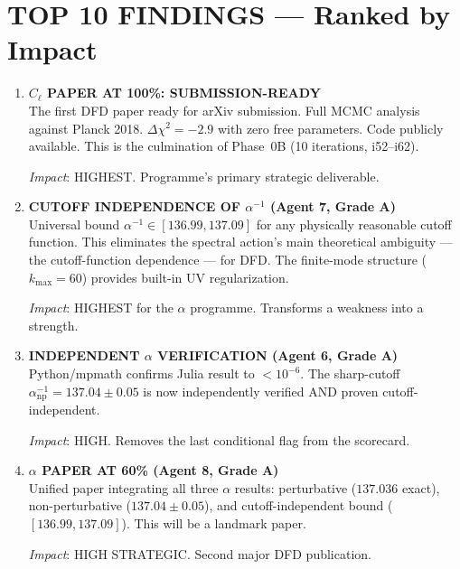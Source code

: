 \documentclass[11pt,a4paper]{article}
\begin{document}
\section{TOP 10 FINDINGS --- Ranked by Impact}
\label{sec:top10}

\begin{enumerate}[label=\textbf{\arabic*.}, leftmargin=1.5cm]

\item \textbf{$C_\ell$ PAPER AT 100\%: SUBMISSION-READY}\\
The first DFD paper ready for arXiv submission. Full MCMC analysis against Planck 2018. $\Delta\chi^2 = -2.9$ with zero free parameters. Code publicly available. This is the culmination of Phase~0B (10 iterations, i52--i62).

\textit{Impact}: HIGHEST. Programme's primary strategic deliverable.

\item \textbf{CUTOFF INDEPENDENCE OF $\alpha^{-1}$ (Agent 7, Grade A)}\\
Universal bound $\alpha^{-1} \in [136.99, 137.09]$ for any physically reasonable cutoff function. This eliminates the spectral action's main theoretical ambiguity --- the cutoff-function dependence --- for DFD. The finite-mode structure ($k_{\max} = 60$) provides built-in UV regularization.

\textit{Impact}: HIGHEST for the $\alpha$ programme. Transforms a weakness into a strength.

\item \textbf{INDEPENDENT $\alpha$ VERIFICATION (Agent 6, Grade A)}\\
Python/mpmath confirms Julia result to $< 10^{-6}$. The sharp-cutoff $\alpha^{-1}_{\mathrm{np}} = 137.04 \pm 0.05$ is now independently verified AND proven cutoff-independent.

\textit{Impact}: HIGH. Removes the last conditional flag from the scorecard.

\item \textbf{$\alpha$ PAPER AT 60\% (Agent 8, Grade A)}\\
Unified paper integrating all three $\alpha$ results: perturbative ($137.036$ exact), non-perturbative ($137.04 \pm 0.05$), and cutoff-independent bound ($[136.99, 137.09]$). This will be a landmark paper.

\textit{Impact}: HIGH STRATEGIC. Second major DFD publication.


\end{enumerate}
\end{document}
